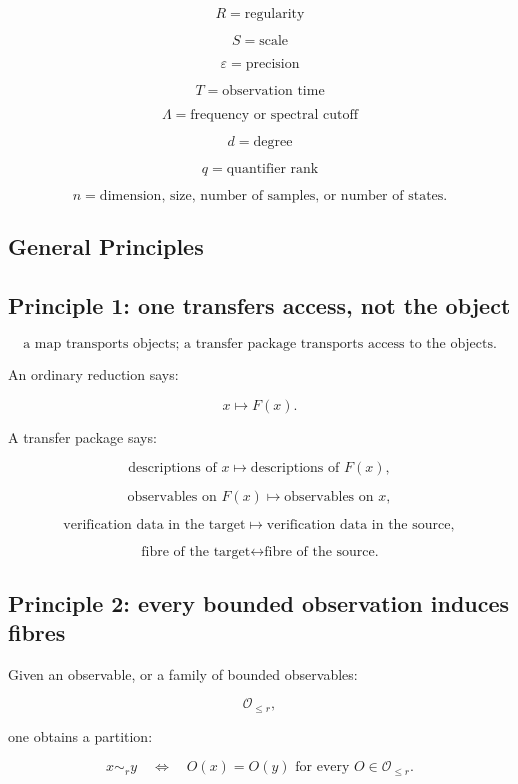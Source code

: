 \documentclass[11pt]{article}
\begin{document}
\[
R=\text{regularity}
\]

\[
S=\text{scale}
\]

\[
\varepsilon=\text{precision}
\]

\[
T=\text{observation time}
\]

\[
\Lambda=\text{frequency or spectral cutoff}
\]

\[
d=\text{degree}
\]

\[
q=\text{quantifier rank}
\]

\[
n=\text{dimension, size, number of samples, or number of states.}
\]



\subsection{General Principles}

\subsection*{Principle 1: one transfers access, not the object}

\[
\boxed{
\text{a map transports objects; a transfer package transports access to the objects.}
}
\]

An ordinary reduction says:

\[
x\mapsto F(x).
\]

A transfer package says:

\[
\text{descriptions of }x
\mapsto
\text{descriptions of }F(x),
\]

\[
\text{observables on }F(x)
\mapsto
\text{observables on }x,
\]

\[
\text{verification data in the target}
\mapsto
\text{verification data in the source},
\]

\[
\text{fibre of the target}
\leftrightarrow
\text{fibre of the source.}
\]



\subsection*{Principle 2: every bounded observation induces fibres}

Given an observable, or a family of bounded observables:

\[
\mathcal O_{\le r},
\]

one obtains a partition:

\[
x\sim_r y
\quad\Longleftrightarrow\quad
O(x)=O(y)
\text{ for every } O\in\mathcal O_{\le r}.
\]
\end{document}
